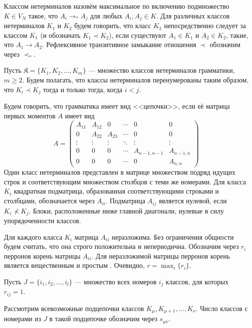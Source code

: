 \documentclass{article}
\begin{document}
Классом нетерминалов назовём максимальное по включению подмножество $K \in V_N$ такое, что $A_i \rightarrow_* A_j$ для любых $A_i, A_j \in K$. Для различных классов нетерминалов $K_1$ и $K_2$ будем говорить, что класс $K_2$ непосредственно следует за классом $K_1$ (и обозначать $K_1 \prec K_2$), если существуют $A_1 \in K_1$ и $A_2 \in K_2$, такие, что $A_1 \rightarrow A_2$. Рефлексивное транзитивное замыкание отношения $\prec$ обозначим через $\prec_*$.

Пусть $\mathfrak{K} = \{ K_1, K_2, \ldots, K_m \}$ --- множество классов нетерминалов грамматики, $m \geqslant 2$. Будем полагать, что классы нетерминалов перенумерованы таким образом, что $K_i \prec K_j$ тогда и только тогда, когда $i < j$.

Будем говорить, что грамматика имеет вид <<цепочки>>, если её матрица первых моментов $A$ имеет вид
\begin{equation*}
    A = 
    \begin{pmatrix}
        A_{11} & A_{12} & 0 & \cdots & 0 & 0 \\
        0 & A_{22} & A_{23} & \cdots & 0 & 0 \\
        \vdots & \vdots & \vdots & \ddots & \vdots & \vdots \\
        0 & 0 & 0 & \cdots & A_{n-1,n-1} & A_{n-1,n} \\
        0 & 0 & 0 & \cdots & 0 & A_{n,n}
    \end{pmatrix}
\end{equation*}
Один класс нетерминалов представлен в матрице множеством подряд идущих строк и соответствующим множеством столбцов с теми же номерами. Для класса $K_i$ квадратная подматрица, образованная соответствующими строками и столбцами, обозначается через $A_{ii}$. Подматрица $A_{ij}$ является нулевой, если $K_i \nprec K_j$. Блоки, расположенные ниже главной диагонали, нулевые в силу упорядоченности классов.

Для каждого класса $K_i$ матрица $A_{ii}$ неразложима. Без ограничения общности будем считать, что она строго положительна и непериодична. Обозначим через $r_i$ перронов корень матрицы $A_{ii}$. Для неразложимой матрицы перронов корень является вещественным и простым \cite{gantmaher}. Очевидно, $r = \max_i \{ r_i \}$.

Пусть $J = \{ i_1, i_2, \ldots, i_l \}$ --- множество всех номеров $i_j$ классов, для которых $r_{ij} = 1$.

Рассмотрим всевозможные подцепочки классов $K_\mu, K_{\mu+1}, \ldots, K_\nu$. Число классов с номерами из $J$ в такой подцепочке обозначим через $s_{\mu \nu}$.
\end{document}
